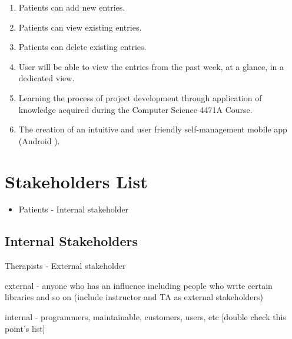 \documentclass[11pt]{article}
\begin{document}
    \begin{enumerate}[label=O\arabic*]
        \item Patients can add new entries.
        \item Patients can view existing entries.
        \item Patients can delete existing entries.
        \item User will be able to view the entries from the past week, at a glance, in a dedicated view.
        \item Learning the process of project development through application of knowledge acquired during the Computer Science 4471A Course.
        \item The creation of an intuitive and user friendly self-management mobile app (Android ). %
    \end{enumerate}


    \section{Stakeholders List}\label{sec:stakeholders-list}
    \begin{itemize}
        \item Patients - Internal stakeholder
    \end{itemize}

    \subsection{Internal Stakeholders}\label{subsec:internal-stakeholders}
    \item Therapists - External stakeholder
    \item external - anyone who has an influence\; including people who write certain libraries and so on  (include instructor and TA as external stakeholders)
    \item internal - programmers, maintainable, customers, users, etc [double check this point's list]
\end{document}

